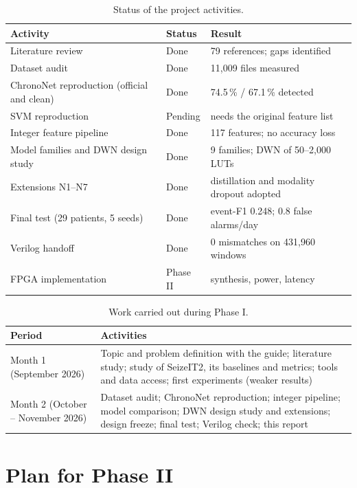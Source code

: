 \begin{table}[H]
\centering\small
\caption{Status of the project activities.}\label{tab:status}
\begin{tabularx}{\textwidth}{@{}P{62mm}P{22mm}L@{}}
\toprule
\textbf{Activity} & \textbf{Status} & \textbf{Result}\\
\midrule
Literature review & Done & 79 references; gaps identified\\
Dataset audit & Done & 11,009 files measured\\
ChronoNet reproduction (official and clean) & Done & 74.5\,\% / 67.1\,\% detected\\
SVM reproduction & Pending & needs the original feature list\\
Integer feature pipeline & Done & 117 features; no accuracy loss\\
Model families and DWN design study & Done & 9 families; DWN of 50--2,000 LUTs\\
Extensions N1--N7 & Done & distillation and modality dropout adopted\\
Final test (29 patients, 5 seeds) & Done & event-F1 0.248; 0.8 false alarms/day\\
Verilog handoff & Done & 0 mismatches on 431,960 windows\\
FPGA implementation & Phase II & synthesis, power, latency\\
\bottomrule
\end{tabularx}
\end{table}

\begin{table}[H]
\centering\small
\caption{Work carried out during Phase I.}\label{tab:phase1-months}
\begin{tabularx}{\textwidth}{@{}P{30mm}L@{}}
\toprule
\textbf{Period} & \textbf{Activities}\\
\midrule
Month 1 (September 2026) & Topic and problem definition with the guide; literature study; study of SeizeIT2, its
baselines and metrics; tools and data access; first experiments (weaker results)\\
Month 2 (October -- November 2026) & Dataset audit; ChronoNet reproduction; integer pipeline; model comparison; DWN
design study and extensions; design freeze; final test; Verilog check; this report\\
\bottomrule
\end{tabularx}
\end{table}

\section{Plan for Phase II}

